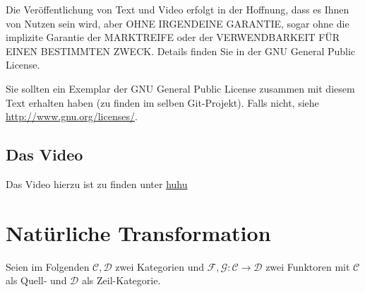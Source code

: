 \documentclass[a4paper]{amsart}
\theoremstyle{definition}
\begin{document}
Die Veröffentlichung von Text und Video erfolgt in der Hoffnung, dass es Ihnen von Nutzen sein wird, 
aber OHNE IRGENDEINE GARANTIE, sogar ohne die implizite Garantie der MARKTREIFE oder der 
VERWENDBARKEIT FÜR EINEN BESTIMMTEN ZWECK. Details finden Sie in der GNU General Public License.

Sie sollten ein Exemplar der GNU General Public License zusammen mit diesem Text erhalten haben 
(zu finden im selben Git-Projekt). 
Falls nicht, siehe \url{http://www.gnu.org/licenses/}.

\subsection*{Das Video}
Das Video hierzu ist zu finden unter 
{\tiny
   \url{huhu}
}

\section{Natürliche Transformation}
Seien im Folgenden $\mathcal{C,D}$ zwei Kategorien und $\mathcal F,\mathcal G \colon \mathcal C \to \mathcal D$ zwei Funktoren mit $\mathcal C$ als Quell- und $\mathcal D$ als Zeil-Kategorie.

\end{document}

